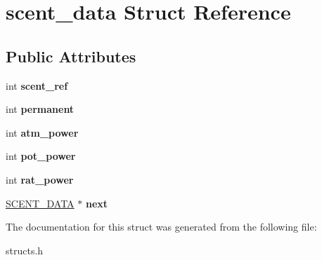 \hypertarget{structscent__data}{\section{scent\-\_\-data Struct Reference}
\label{structscent__data}
}
\subsection*{Public Attributes}
\begin{DoxyCompactItemize}
\item 
\hypertarget{structscent__data_a64174fd9dd5bc5edad6de404adde9207}{int {\bfseries scent\-\_\-ref}}\label{structscent__data_a64174fd9dd5bc5edad6de404adde9207}

\item 
\hypertarget{structscent__data_a1897cb251381c41c2f46e28a2dbf3f01}{int {\bfseries permanent}}\label{structscent__data_a1897cb251381c41c2f46e28a2dbf3f01}

\item 
\hypertarget{structscent__data_a7395d0b6e08aae9ab46a58e0d1f4dba9}{int {\bfseries atm\-\_\-power}}\label{structscent__data_a7395d0b6e08aae9ab46a58e0d1f4dba9}

\item 
\hypertarget{structscent__data_afed2a2167fee608add589f51afef8652}{int {\bfseries pot\-\_\-power}}\label{structscent__data_afed2a2167fee608add589f51afef8652}

\item 
\hypertarget{structscent__data_a6b5bfde0ebc03f7abf2e26a6ffd90ee6}{int {\bfseries rat\-\_\-power}}\label{structscent__data_a6b5bfde0ebc03f7abf2e26a6ffd90ee6}

\item 
\hypertarget{structscent__data_ac5e045f46ad3bb7e8d4554fde2d6d82e}{\hyperlink{structscent__data}{S\-C\-E\-N\-T\-\_\-\-D\-A\-T\-A} $\ast$ {\bfseries next}}\label{structscent__data_ac5e045f46ad3bb7e8d4554fde2d6d82e}

\end{DoxyCompactItemize}


The documentation for this struct was generated from the following file\-:\begin{DoxyCompactItemize}
\item 
structs.\-h\end{DoxyCompactItemize}
